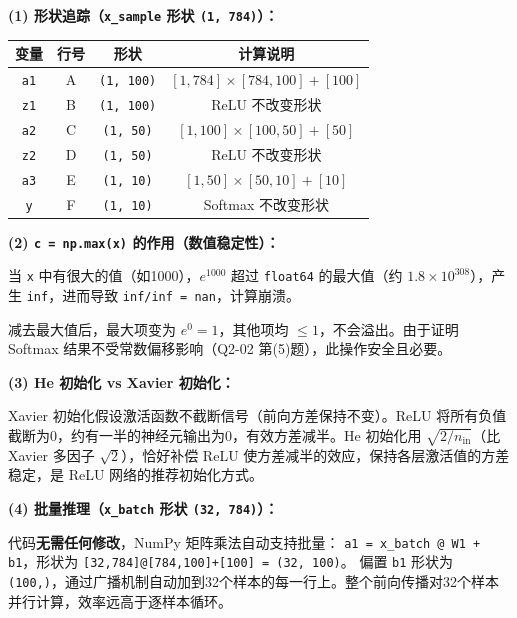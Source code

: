 \documentclass[a4paper,11pt]{ctexart}
\begin{document}
\begin{solutionbox}[参考答案与详细解析]
    \textbf{(1) 形状追踪（\texttt{x\_sample} 形状 \texttt{(1, 784)}）：}

    \begin{center}
    \begin{tabular}{cccc}
        \toprule
        变量 & 行号 & 形状 & 计算说明 \\
        \midrule
        \texttt{a1} & A & \texttt{(1, 100)} & $[1,784]\times[784,100]+[100]$ \\
        \texttt{z1} & B & \texttt{(1, 100)} & ReLU 不改变形状 \\
        \texttt{a2} & C & \texttt{(1, 50)}  & $[1,100]\times[100,50]+[50]$ \\
        \texttt{z2} & D & \texttt{(1, 50)}  & ReLU 不改变形状 \\
        \texttt{a3} & E & \texttt{(1, 10)}  & $[1,50]\times[50,10]+[10]$ \\
        \texttt{y}  & F & \texttt{(1, 10)}  & Softmax 不改变形状 \\
        \bottomrule
    \end{tabular}
    \end{center}

    \textbf{(2) \texttt{c = np.max(x)} 的作用（数值稳定性）：}

    当 \texttt{x} 中有很大的值（如1000），$e^{1000}$ 超过 \texttt{float64} 的最大值（约 $1.8\times10^{308}$），产生 \texttt{inf}，进而导致 \texttt{inf/inf = nan}，计算崩溃。

    减去最大值后，最大项变为 $e^0=1$，其他项均 $\leq 1$，不会溢出。由于证明 Softmax 结果不受常数偏移影响（Q2-02 第(5)题），此操作安全且必要。

    \textbf{(3) He 初始化 vs Xavier 初始化：}

    Xavier 初始化假设激活函数不截断信号（前向方差保持不变）。ReLU 将所有负值截断为0，约有一半的神经元输出为0，有效方差减半。He 初始化用 $\sqrt{2/n_{\text{in}}}$（比 Xavier 多因子 $\sqrt{2}$），恰好补偿 ReLU 使方差减半的效应，保持各层激活值的方差稳定，是 ReLU 网络的推荐初始化方式。

    \textbf{(4) 批量推理（\texttt{x\_batch} 形状 \texttt{(32, 784)}）：}

    代码\textbf{无需任何修改}，NumPy 矩阵乘法自动支持批量：
    \texttt{a1 = x\_batch @ W1 + b1}，形状为 \texttt{[32,784]@[784,100]+[100] = (32, 100)}。
    偏置 \texttt{b1} 形状为 \texttt{(100,)}，通过广播机制自动加到32个样本的每一行上。整个前向传播对32个样本并行计算，效率远高于逐样本循环。


\end{solutionbox}
\end{document}
